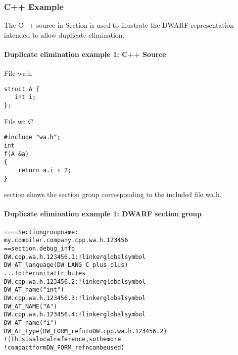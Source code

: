 \subsubsection{C++ Example}

The C++ source in 
Section 
is used to illustrate the DWARF
representation intended to allow duplicate elimination.

\paragraph{Duplicate elimination example 1: C++ Source} 
\label{app:duplicateeliminationexample1csource}

File wa.h

\begin{lstlisting}
struct A {
   int i;
};
\end{lstlisting}

File wa.C

\begin{lstlisting}
#include "wa.h";
int
f(A &a)
{
    return a.i + 2;
}
\end{lstlisting}


section 
shows the section group corresponding to the included file 
wa.h.


\paragraph{Duplicate elimination example 1: DWARF section group} 

\label{app:duplicateeliminationexample1dwarfsectiongroup}

\begin{alltt}
==== Section group name:
    my.compiler.company.cpp.wa.h.123456
== section .debug\_info
DW.cpp.wa.h.123456.1: ! linker global symbol
        DW\_AT\_language(DW\_LANG\_C\_plus\_plus)
        ...  ! other unit attributes
DW.cpp.wa.h.123456.2: ! linker global symbol
        DW\_AT\_name("int")
DW.cpp.wa.h.123456.3: ! linker global symbol
        DW\_AT\_NAME("A")
DW.cpp.wa.h.123456.4: ! linker global symbol
        DW\_AT\_name("i")
        DW\_AT\_type(DW\_FORM\_refn to DW.cpp.wa.h.123456.2)
            ! (This is a local reference, so the more
            ! compact form DW\_FORM\_refn can be used)
\end{alltt}


